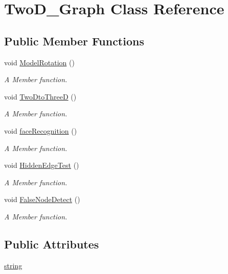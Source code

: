\hypertarget{classTwoD__Graph}{}\section{Two\+D\+\_\+\+Graph Class Reference}
\label{classTwoD__Graph}
\subsection*{Public Member Functions}
\begin{DoxyCompactItemize}
\item 
void \hyperlink{classTwoD__Graph_a4ea9b3916310a6653bd363f45b35f7d6}{Model\+Rotation} ()
\begin{DoxyCompactList}\small\item\em A Member function. \end{DoxyCompactList}\item 
void \hyperlink{classTwoD__Graph_a167c4b80746c6ba30df11616101d8cbf}{Two\+Dto\+ThreeD} ()
\begin{DoxyCompactList}\small\item\em A Member function. \end{DoxyCompactList}\item 
void \hyperlink{classTwoD__Graph_ac1a83491b4576bbeea2e7ff4aaf22326}{face\+Recognition} ()
\begin{DoxyCompactList}\small\item\em A Member function. \end{DoxyCompactList}\item 
void \hyperlink{classTwoD__Graph_a594b2c26d33fd97b5e35fe3344947fad}{Hidden\+Edge\+Test} ()
\begin{DoxyCompactList}\small\item\em A Member function. \end{DoxyCompactList}\item 
void \hyperlink{classTwoD__Graph_ae1fe8082c3ad3042f4051ef9f5687705}{False\+Node\+Detect} ()
\begin{DoxyCompactList}\small\item\em A Member function. \end{DoxyCompactList}\end{DoxyCompactItemize}
\subsection*{Public Attributes}
\begin{DoxyCompactItemize}
\item 
\hyperlink{classTwoD__Graph_aa160d3945f96eb25456a51d77f1c86e2}{string}
\end{DoxyCompactItemize}


